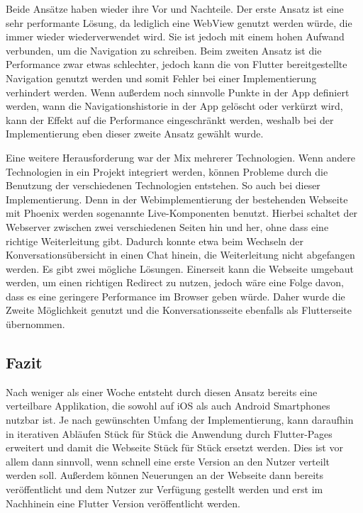 Beide Ansätze haben wieder ihre Vor und Nachteile. Der erste Ansatz ist eine sehr performante Lösung, da lediglich eine WebView genutzt werden würde, die immer wieder wiederverwendet wird. Sie ist jedoch mit einem hohen Aufwand verbunden, um die Navigation zu schreiben.
Beim zweiten Ansatz ist die Performance zwar etwas schlechter, jedoch kann die von Flutter bereitgestellte Navigation genutzt werden und somit Fehler bei einer Implementierung verhindert werden.
Wenn außerdem noch sinnvolle Punkte in der App definiert werden, wann die Navigationshistorie in der App gelöscht oder verkürzt wird, kann der Effekt auf die Performance eingeschränkt werden, weshalb bei der Implementierung eben dieser zweite Ansatz gewählt wurde. 

Eine weitere Herausforderung war der Mix mehrerer Technologien. Wenn andere Technologien in ein Projekt integriert werden, können Probleme durch die Benutzung der verschiedenen Technologien entstehen. So auch bei dieser Implementierung. Denn in der Webimplementierung der bestehenden Webseite mit Phoenix werden sogenannte Live-Komponenten benutzt. Hierbei schaltet der Webserver zwischen zwei verschiedenen Seiten hin und her, ohne dass eine richtige Weiterleitung gibt. Dadurch konnte etwa beim Wechseln der Konversationsübersicht in einen Chat hinein, die Weiterleitung nicht abgefangen werden. Es gibt zwei mögliche Lösungen. Einerseit kann die Webseite umgebaut werden, um einen richtigen Redirect zu nutzen, jedoch wäre eine Folge davon,  dass es eine geringere Performance im Browser geben würde. Daher wurde die Zweite Möglichkeit genutzt und die Konversationsseite ebenfalls als Flutterseite übernommen.

\subsection{Fazit}
Nach weniger als einer Woche entsteht durch diesen Ansatz bereits eine verteilbare Applikation, die sowohl auf iOS als auch Android Smartphones nutzbar ist. Je nach gewünschten Umfang der Implementierung, kann daraufhin in iterativen Abläufen Stück für Stück die Anwendung durch Flutter-Pages erweitert und damit die Webseite Stück für Stück ersetzt werden.
Dies ist vor allem dann sinnvoll, wenn schnell eine erste Version an den Nutzer verteilt werden soll. Außerdem können Neuerungen an der Webseite dann bereits veröffentlicht und dem Nutzer zur Verfügung gestellt werden und erst im Nachhinein eine Flutter Version veröffentlicht werden.